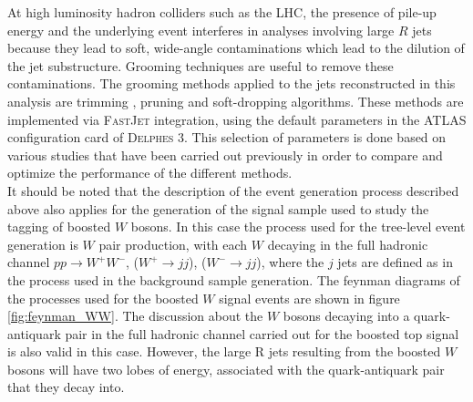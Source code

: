 \documentclass[main]{subfiles} %
\begin{document}

At high luminosity hadron colliders such as the LHC, the presence of pile-up energy and the underlying event interferes in analyses involving large $R$ jets because they lead to soft, wide-angle contaminations which lead to the dilution of the jet substructure. Grooming techniques are useful to remove these contaminations. The grooming methods applied to the jets reconstructed in this analysis are trimming \cite{Krohn2010}, pruning \cite{Ellis2009} and soft-dropping \cite{Larkoski2014} algorithms. These methods are implemented via \textsc{FastJet} integration, using the default parameters in the ATLAS configuration card of \textsc{Delphes 3}. This selection of parameters is done based on various studies that have been carried out previously in order to compare and optimize the performance of the different methods.\\

It should be noted that the description of the event generation process described above also applies for the generation of the signal sample used to study the tagging of boosted $W$ bosons. In this case the process used for the tree-level event generation is $W$ pair production, with each $W$ decaying in the full hadronic channel $pp \rightarrow W^{+}W^{-}$, ($W^{+} \rightarrow jj$), ($W^{-} \rightarrow jj$), where the $j$ jets are defined as in the process used in the background sample generation. The feynman diagrams of the processes used for the boosted $W$ signal events are shown in figure \ref{fig:feynman_WW}. The discussion about the $W$ bosons decaying into a quark-antiquark pair in the full hadronic channel carried out for the boosted top signal is also valid in this case. However, the large R jets resulting from the boosted $W$ bosons will have two lobes of energy, associated with the quark-antiquark pair that they decay into. \\
\end{document}
